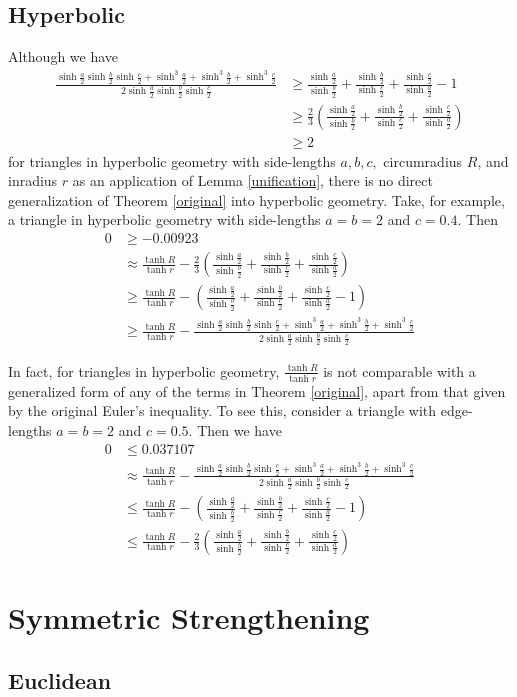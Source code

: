 \documentclass[12pt,notitlepage]{amsart}%
\newcommand{\sh}[1]{\sinh \frac{#1}{2}}
\newcommand{\fracsumh}{\frac{\sh{a}}{\sh{b}}+\frac{\sh{b}}{\sh{c}}+\frac{\sh{c}}{\sh{a}}}
\begin{document}
\subsection{Hyperbolic} \label{section-hyperbolic-orig}
Although we have 
\begin{align*}
	\frac{\sh{a}\sh{b}\sh{c}+\sinh^3\frac{a}{2}+\sinh^3\frac{b}{2}+\sinh^3\frac{c}{2}}{2\sh{a}\sh{b}\sh{c}}&\geq \fracsumh-1\\
    &\geq\frac{2}{3}\left( \fracsumh\right)\\
    &\geq 2
\end{align*}
for triangles in hyperbolic geometry with side-lengths $a,b,c,$ circumradius $R$, and inradius $r$ as an application of Lemma \ref{unification}, there is no direct generalization of Theorem \ref{original} into hyperbolic geometry. 
Take, for example, a triangle in hyperbolic geometry with side-lengths $a=b=2$ and $c=0.4$.  Then
\begin{align*}
	0&\geq -0.00923\\
    &\approx\frac{\tanh R}{\tanh r}-\frac{2}{3}\left( \fracsumh\right)\\
    &\geq\frac{\tanh R}{\tanh r}-\left( \fracsumh-1\right)\\
    &\geq\frac{\tanh R}{\tanh r}-\frac{\sh{a}\sh{b}\sh{c}+\sinh^3\frac{a}{2}+\sinh^3\frac{b}{2}+\sinh^3\frac{c}{2}}{2\sh{a}\sh{b}\sh{c}}
\end{align*}

In fact, for triangles in hyperbolic geometry, $\frac{\tanh R}{\tanh r}$ is not comparable with a generalized form of any of the terms in Theorem \ref{original}, apart from that given by the original Euler's inequality. To see this, consider a triangle with edge-lengths $a=b=2$ and $c=0.5$. Then we have
\begin{align*}
	0&\leq0.037107\\
    &\approx \frac{\tanh R}{\tanh r}-\frac{\sh{a}\sh{b}\sh{c}+\sinh^3\frac{a}{2}+\sinh^3\frac{b}{2}+\sinh^3\frac{c}{2}}{2\sh{a}\sh{b}\sh{c}}\\
    &\leq\frac{\tanh R}{\tanh r}-\left( \fracsumh-1\right)\\
    &\leq\frac{\tanh R}{\tanh r}-\frac{2}{3}\left( \fracsumh\right)
\end{align*}
\section{Symmetric Strengthening}

\subsection{Euclidean}
\end{document}
